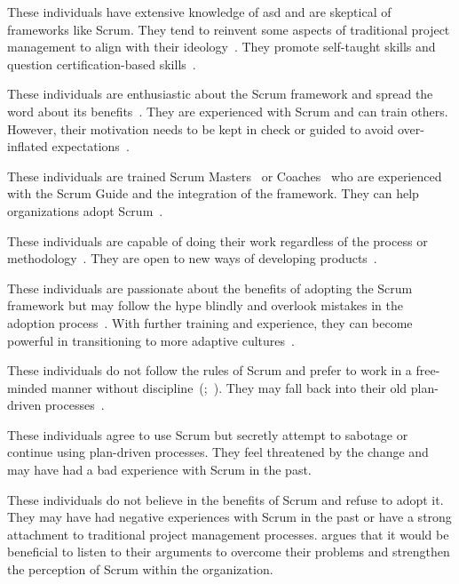 \begin{description}[style=nextline]
    \item[Agile-Purist] 
    These individuals have extensive knowledge of \ac{asd} and are skeptical of \glspl{framework} like Scrum. They tend to reinvent some aspects of traditional project management to align with their \gls{ideology}~\cite[p.~32]{Belling2020AtS}. They promote self-taught skills and question certification-based skills~\cite[p.~45]{Belling2020AtS}.
    \item[Scrum-Evangelist (or Enthusiasts)] 
    These individuals are enthusiastic about the Scrum \gls{framework} and spread the word about its benefits~\cite[p.~108]{Marchi2009WS}. They are experienced with Scrum and can train others. However, their motivation needs to be kept in check or guided to avoid over-inflated expectations~\cite[p.~110]{Marchi2009WS}.
    \item[Scrum-Innovator] 
    These individuals are trained Scrum Masters~\cite[p.~227]{Schnegas2019AiF} or Coaches~\cite[p.~95]{Moreira2013AtA} who are experienced with the Scrum Guide and the integration of the \gls{framework}. They can help organizations adopt Scrum~\cite[p.~95]{Marchi2009WS}.
    \item[Highly-Motivated-Individuals] 
    These individuals are capable of doing their work regardless of the process or \gls{methodology}~\cite[p.~127]{Philipp2016MMf}. They are open to new ways of developing products~\cite[p.~65]{boehm2002get}.
    \item[Scrum-Hype-Follower] 
    These individuals are passionate about the benefits of adopting the Scrum \gls{framework} but may follow the hype blindly and overlook mistakes in the \gls{adoption} process~\cite[p.~2]{Ozkan2021HSI}. With further training and experience, they can become powerful in transitioning to more adaptive cultures~\cite[p.~96]{Moreira2013AtA}.
    \item[Undisciplined-Scrum-User] 
    These individuals do not follow the rules of Scrum and prefer to work in a free-minded manner without discipline~(;~). They may fall back into their old \gls{plan-driven} processes~\cite[p.~110]{Marchi2009WS}.
    \item[Agile-Deceiver] 
    These individuals agree to use Scrum but secretly attempt to sabotage or continue using \gls{plan-driven} processes. They feel threatened by the change and may have had a bad experience with Scrum in the past.~\cite[p.~96]{Moreira2013AtA}
    \item[Scrum-Denier] 
    These individuals do not believe in the benefits of Scrum and refuse to adopt it. They may have had negative experiences with Scrum in the past or have a strong attachment to traditional project management processes.  argues that it would be beneficial to listen to their arguments to overcome their problems and strengthen the perception of Scrum within the organization.
\end{description}

